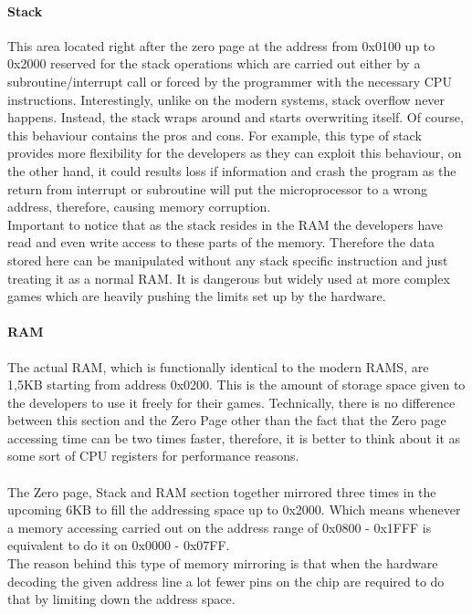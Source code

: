 \documentclass[]{report}
\begin{document}
 \paragraph{Stack}
 This area located right after the zero page at the address from 0x0100 up to 0x2000 reserved for the stack operations which are carried out either by a subroutine/interrupt call or forced by the programmer with the necessary CPU instructions. Interestingly, unlike on the modern systems, stack overflow never happens. Instead, the stack wraps around and starts overwriting itself. Of course, this behaviour contains the pros and cons. For example, this type of stack provides more flexibility for the developers as they can exploit this behaviour, on the other hand, it could results loss if information and crash the program as the return from interrupt or subroutine will put the microprocessor to a wrong address, therefore, causing memory corruption.
\\
Important to notice that as the stack resides in the RAM the developers have read and even write access to these parts of the memory. Therefore the data stored here can be manipulated without any stack specific instruction and just treating it as a normal RAM. It is dangerous but widely used at more complex games which are heavily pushing the limits set up by the hardware.

\paragraph{RAM}
The actual RAM, which is functionally identical to the modern RAMS, are 1,5KB starting from address 0x0200. This is the amount of storage space given to the developers to use it freely for their games. Technically, there is no difference between this section and the Zero Page other than the fact that the Zero page accessing time can be two times faster, therefore, it is better to think about it as some sort of CPU registers for performance reasons. 

\paragraph{ }
The Zero page, Stack and RAM section together mirrored three times in the upcoming 6KB to fill the addressing space up to 0x2000. Which means whenever a memory accessing carried out on the address range of 0x0800 - 0x1FFF is equivalent to do it on 0x0000 - 0x07FF.
\\
The reason behind this type of memory mirroring is that when the hardware decoding the given address line a lot fewer pins on the chip are required to do that by limiting down the address space.
 
\end{document}
